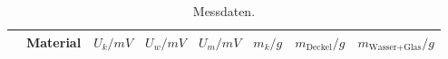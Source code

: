 \begin{table}
  \caption{Messdaten.}
  \centering
  \label{tab:par}
  \begin{tabular}{l@{} c S[table-format=1.2] S[table-format=1.2] S[table-format=1.3] S[table-format=3.2] S[table-format=3.2] S[table-format=3.2]}
    \toprule
    & Material & $U_k/\si{mV}$ & $U_w/\si{mV}$ & $U_m/\si{mV}$ & $m_k/\si{g}$ & $m_\text{Deckel}/\si{g}$ & $m_\text{Wasser+Glas}/\si{g}$ \\
    \midrule
    
    \bottomrule
  \end{tabular}
\end{table}
